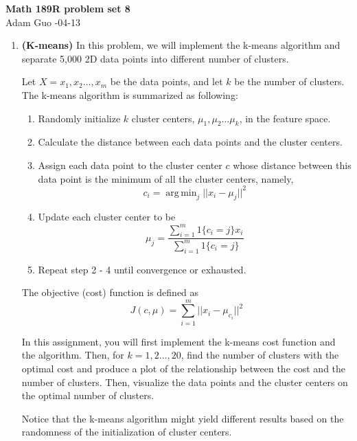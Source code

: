 \documentclass[letter,11pt]{article}
\DeclareMathOperator*{\argmin}{arg\,min}
\newcommand{\0}{\mathbf{0}}
\begin{document}
\begin{center}
    {\bf \Large Math 189R problem set 8} \\
    \vspace{0.1in}
    Adam Guo -04-13
\end{center}

\begin{enumerate}
    \item \textbf{(K-means)} In this problem, we will implement the k-means algorithm and separate 5,000 2D data points into different number of clusters.
    
    Let $X = {x_1, x_2 \ldots, x_m} $ be the data points, and let $k$ be the number of clusters. The k-means algorithm is summarized as following:

    \begin{enumerate}
        \item Randomly initialize $k$ cluster centers, $\mu_1, \mu_2 \ldots \mu_k$, in the feature space.
        \item Calculate the distance between each data points and the cluster centers.
        \item Assign each data point to the cluster center $c$ whose distance between this data point is the minimum of all the cluster centers, namely, \[c_i = \argmin_j ||x_i - \mu_j||^2\]
        \item Update each cluster center to be \[\mu_j = \frac{\sum_{i=1}^{m}1\{c_i = j\}x_i}{\sum_{i = 1}^{m}1\{c_i = j\}}\]
        \item Repeat step 2 - 4 until convergence or exhausted.
    \end{enumerate}

    The objective (cost) function is defined as \[J(c, \mu) = \sum_{i = 1}^{m}||x_i - \mu_{c_i}||^2\]
    
    In this assignment, you will first implement the k-means cost function and the algorithm. Then, for $k = 1, 2 \ldots, 20$, find the number of clusters with the optimal cost and produce a plot of the relationship between the cost and the number of clusters. Then, visualize the data points and the cluster centers on the optimal number of clusters.
    
    Notice that the k-means algorithm might yield different results based on the randomness of the initialization of cluster centers.


\end{enumerate}
\end{document}
